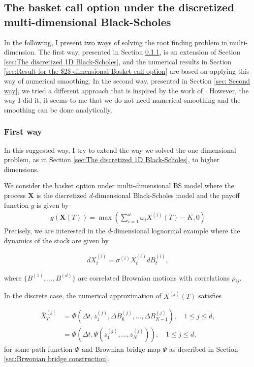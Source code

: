 

\subsection{The  basket call option under the discretized multi-dimensional Black-Scholes}\label{sec:The basket option under time stepping framework}

In the following, I present two ways of solving the root finding problem in multi-dimension. The first way, presented in Section \ref{sec: First way},  is an extension of Section \ref{sec:The discretized 1D Black-Scholes}, and the numerical results in Section \ref{sec:Result for the  $2$-dimensional Basket call option} are based on applying this way of numerical smoothing. In the second way, presented in Section \ref{sec: Second way}, we tried a different approach that is inspired by  the work of \cite{bayersmoothing}. However, the way I did it, it seems to me that we do not  need numerical smoothing and the smoothing can be done analytically.

\subsubsection{First way}\label{sec: First way}
In this suggested way, I try to extend the way we solved the one dimensional problem, as in Section \ref{sec:The discretized 1D Black-Scholes}, to higher dimensions.

We consider the basket option under multi-dimensional BS model where the process $\mathbf{X}$ is the discretized $d$-dimensional Black-Scholes model and the payoff function $g$ is given by
\begin{align}
	g(\mathbf{X}(T))=\max\left(\sum_{i=1}^{d} \omega_{i} X^{(i)}(T)-K,0  \right)	
\end{align}
Precisely, we are interested in the  $d$-dimensional lognormal example where the dynamics of the stock are given by

\begin{align}\label{lognormal_dynamics_basket}
	dX^{(i)}_t=\sigma^{(i)} X^{(i)}_t dB^{(i)}_t,
\end{align}

where $\{B^{(1)}, \dots,B^{(d)}\}$ are correlated Brownian motions with correlations $\rho_{ij}$.


In the discrete case, the numerical approximation of $X^{(j)}(T)$ satisfies


\begin{align}
	\bar{X}^{(j)}_T&=\Phi(\Delta t, z_1^{(j)}, \Delta B^{(j)}_0,\dots,\Delta B^{(j)}_{N-1}),  \quad 1 \le j \le d, \\ \nonumber
	&=\Phi(\Delta t, \Psi(z_1^{(j)},\dots,z_N^{(j)})), \quad 1 \le j \le d,
\end{align}
for some path function $\Phi$ and Brownian bridge map $\Psi$ as described in Section \ref{sec:Brwonian bridge construction}.

